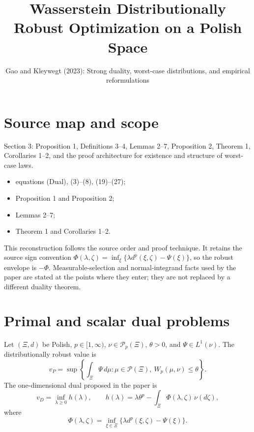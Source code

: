 
\title{Wasserstein Distributionally Robust Optimization on a Polish Space}
\author{}
\date{Gao and Kleywegt (2023): Strong duality, worst-case distributions, and empirical reformulations}

\maketitle

\section*{Source map and scope}
\begin{description}[style=nextline,leftmargin=3.2cm,labelwidth=3cm]
\item[Primary source] \texttt{}
\item[Coverage] Section 3: Proposition 1, Definitions 3--4, Lemmas 2--7, Proposition 2, Theorem 1, Corollaries 1--2, and the proof architecture for existence and structure of worst-case laws.
\item[Source anchors]
\begin{itemize}[leftmargin=2em]
  \item equations (Dual), (3)--(8), (19)--(27);
  \item Proposition 1 and Proposition 2;
  \item Lemmas 2--7;
  \item Theorem 1 and Corollaries 1--2.
\end{itemize}
\end{description}

This reconstruction follows the source order and proof technique.  It retains the source sign convention
\(\Phi(\lambda,\zeta)=\inf_\xi\{\lambda d^p(\xi,\zeta)-\Psi(\xi)\}\), so the robust envelope is
\(-\Phi\).  Measurable-selection and normal-integrand facts used by the paper are stated at the points
where they enter; they are not replaced by a different duality theorem.

\section{Primal and scalar dual problems}
Let \((\Xi,d)\) be Polish, \(p\in[1,\infty)\), \(\nu\in\mathcal P_p(\Xi)\), \(\theta>0\), and
\(\Psi\in L^1(\nu)\).  The distributionally robust value is
\[
 v_P=\sup\left\{\int_\Xi\Psi\,d\mu: \mu\in\mathcal P(\Xi),\ W_p(\mu,\nu)\le\theta\right\}.
\]
The one-dimensional dual proposed in the paper is
\begin{equation}\label{eq:gk-dual}
 v_D=\inf_{\lambda\ge0}h(\lambda),\qquad
 h(\lambda)=\lambda\theta^p-\int_\Xi\Phi(\lambda,\zeta)\,\nu(d\zeta),
\end{equation}
where
\begin{equation}\label{eq:gk-Phi}
 \Phi(\lambda,\zeta)=\inf_{\xi\in\Xi}
 \{\lambda d^p(\xi,\zeta)-\Psi(\xi)\}.
\end{equation}


